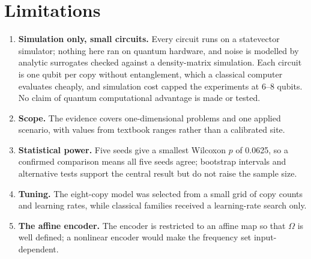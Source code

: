 \section{Limitations}
\label{sec:limitations}

\begin{enumerate}
\item \textbf{Simulation only, small circuits.} Every circuit runs on a statevector
  simulator; nothing here ran on quantum hardware, and noise is modelled by analytic
  surrogates checked against a density-matrix simulation. Each circuit is one qubit per
  copy without entanglement, which a classical computer evaluates cheaply, and simulation
  cost capped the experiments at 6--8 qubits. No claim of quantum computational advantage
  is made or tested.
\item \textbf{Scope.} The evidence covers one-dimensional problems and one applied
  scenario, with values from textbook ranges rather than a calibrated site.
\item \textbf{Statistical power.} Five seeds give a smallest Wilcoxon $p$ of 0.0625, so a
  confirmed comparison means all five seeds agree; bootstrap intervals and alternative
  tests support the central result but do not raise the sample size.
\item \textbf{Tuning.} The eight-copy model was selected from a small grid of copy counts
  and learning rates, while classical families received a learning-rate search only.
\item \textbf{The affine encoder.} The encoder is restricted to an affine map so that
  $\Omega$ is well defined; a nonlinear encoder would make the frequency set
  input-dependent.
\end{enumerate}
